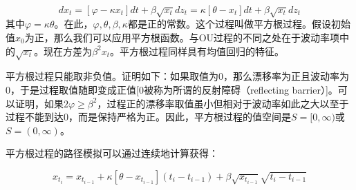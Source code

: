 \documentclass[UTF8]{ctexart}
\begin{document}
$$dx_t=[\varphi-\kappa x_t]dt+\beta \sqrt{x_t}dz_t=\kappa[\theta-x_t]dt+\beta\sqrt{x_t}dz_t$$
其中$\varphi=\kappa \theta$。在此，$\varphi,\theta,\beta,\kappa$都是正的常数。这个过程叫做平方根过程。假设初始值$x_0$为正，那么我们可以应用平方根函数。与OU过程的不同之处在于波动率项中的$\sqrt{x_t}$。现在方差为$\beta^2 x_t$。平方根过程同样具有均值回归的特征。

平方根过程只能取非负值。证明如下：如果取值为0，那么漂移率为正且波动率为0，于是过程取值随即变成正值[0被称为所谓的反射障碍（reflecting barrier）]。可以证明，如果$2\varphi \geqslant \beta^2$，过程正的漂移率取值虽小但相对于波动率如此之大以至于过程不能到达0，而是保持严格为正。因此，平方根过程的值空间是$S=[0,\infty)$或$S=(0,\infty)$。

平方根过程的路径模拟可以通过连续地计算获得：

$$x_{t_i}=x_{t_{i-1}}+\kappa[\theta-x_{t_{i-1}}](t_i-t_{i-1})+\beta\sqrt{x_{t_{i-1}}}\sqrt{t_i-t_{i-1}}$$
\end{document}
